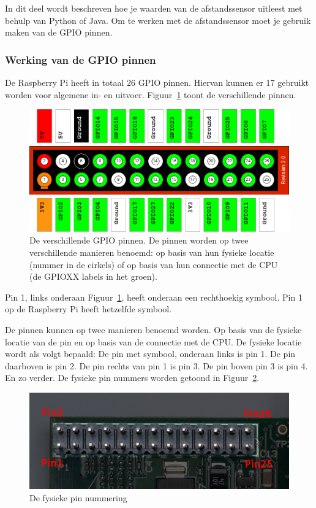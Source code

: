 \documentclass[a4paper]{article}
\begin{document}
    In dit deel wordt beschreven hoe je waarden van de afstandssensor
uitleest met behulp van Python of Java.  Om te werken met de
afstandssensor moet je gebruik maken van de GPIO pinnen.

    \subsubsection{Werking van de GPIO pinnen}

      De Raspberry Pi heeft in totaal 26 GPIO pinnen.  Hiervan kunnen
er 17 gebruikt worden voor algemene in- en uitvoer.
Figuur~\ref{fig:gpio} toont de verschillende pinnen.

      \begin{figure}[h!]
        \centering
        \includegraphics[width=.8\textwidth]{images/gpio.png}
        \caption{De verschillende GPIO pinnen.  De pinnen worden op
twee verschillende manieren benoemd: op basis van hun fysieke locatie
(nummer in de cirkels) of op basis van hun connectie met de CPU (de
GPIOXX labels in het groen).}
        \label{fig:gpio}
      \end{figure}

      Pin 1, links onderaan Figuur~\ref{fig:gpio}, heeft onderaan een
rechthoekig symbool. Pin 1 op de Raspberry Pi heeft hetzelfde symbool.

      De pinnen kunnen op twee manieren benoemd worden.  Op basis van
de fysieke locatie van de pin en op basis van de connectie met de CPU.
De fysieke locatie wordt als volgt bepaald: De pin met symbool, 
onderaan links is pin 1. De pin daarboven is pin 2.  De pin rechts van
pin 1 is pin 3.  De pin boven pin 3 is pin 4.  En zo verder.  De
fysieke pin nummers worden getoond in Figuur~\ref{fig:gpio:physical}.

      \begin{figure}[h!]
        \centering
        \includegraphics[width=.8\textwidth]{images/gpio-physical.png}
        \caption{De fysieke pin nummering}
        \label{fig:gpio:physical}
      \end{figure}
\end{document}
